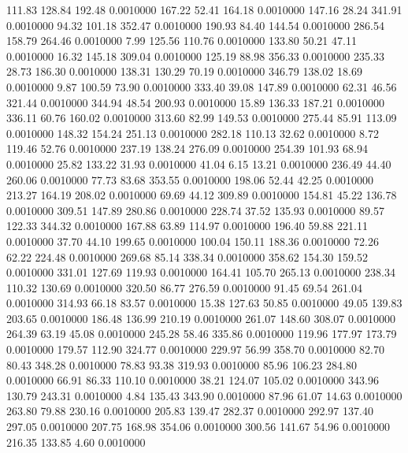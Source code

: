  111.83  128.84  192.48   0.0010000
 167.22   52.41  164.18   0.0010000
 147.16   28.24  341.91   0.0010000
  94.32  101.18  352.47   0.0010000
 190.93   84.40  144.54   0.0010000
 286.54  158.79  264.46   0.0010000
   7.99  125.56  110.76   0.0010000
 133.80   50.21   47.11   0.0010000
  16.32  145.18  309.04   0.0010000
 125.19   88.98  356.33   0.0010000
 235.33   28.73  186.30   0.0010000
 138.31  130.29   70.19   0.0010000
 346.79  138.02   18.69   0.0010000
   9.87  100.59   73.90   0.0010000
 333.40   39.08  147.89   0.0010000
  62.31   46.56  321.44   0.0010000
 344.94   48.54  200.93   0.0010000
  15.89  136.33  187.21   0.0010000
 336.11   60.76  160.02   0.0010000
 313.60   82.99  149.53   0.0010000
 275.44   85.91  113.09   0.0010000
 148.32  154.24  251.13   0.0010000
 282.18  110.13   32.62   0.0010000
   8.72  119.46   52.76   0.0010000
 237.19  138.24  276.09   0.0010000
 254.39  101.93   68.94   0.0010000
  25.82  133.22   31.93   0.0010000
  41.04    6.15   13.21   0.0010000
 236.49   44.40  260.06   0.0010000
  77.73   83.68  353.55   0.0010000
 198.06   52.44   42.25   0.0010000
 213.27  164.19  208.02   0.0010000
  69.69   44.12  309.89   0.0010000
 154.81   45.22  136.78   0.0010000
 309.51  147.89  280.86   0.0010000
 228.74   37.52  135.93   0.0010000
  89.57  122.33  344.32   0.0010000
 167.88   63.89  114.97   0.0010000
 196.40   59.88  221.11   0.0010000
  37.70   44.10  199.65   0.0010000
 100.04  150.11  188.36   0.0010000
  72.26   62.22  224.48   0.0010000
 269.68   85.14  338.34   0.0010000
 358.62  154.30  159.52   0.0010000
 331.01  127.69  119.93   0.0010000
 164.41  105.70  265.13   0.0010000
 238.34  110.32  130.69   0.0010000
 320.50   86.77  276.59   0.0010000
  91.45   69.54  261.04   0.0010000
 314.93   66.18   83.57   0.0010000
  15.38  127.63   50.85   0.0010000
  49.05  139.83  203.65   0.0010000
 186.48  136.99  210.19   0.0010000
 261.07  148.60  308.07   0.0010000
 264.39   63.19   45.08   0.0010000
 245.28   58.46  335.86   0.0010000
 119.96  177.97  173.79   0.0010000
 179.57  112.90  324.77   0.0010000
 229.97   56.99  358.70   0.0010000
  82.70   80.43  348.28   0.0010000
  78.83   93.38  319.93   0.0010000
  85.96  106.23  284.80   0.0010000
  66.91   86.33  110.10   0.0010000
  38.21  124.07  105.02   0.0010000
 343.96  130.79  243.31   0.0010000
   4.84  135.43  343.90   0.0010000
  87.96   61.07   14.63   0.0010000
 263.80   79.88  230.16   0.0010000
 205.83  139.47  282.37   0.0010000
 292.97  137.40  297.05   0.0010000
 207.75  168.98  354.06   0.0010000
 300.56  141.67   54.96   0.0010000
 216.35  133.85    4.60   0.0010000
